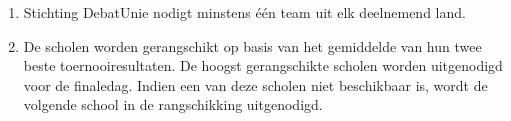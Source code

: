 
\begin{enumerate}
\item Stichting DebatUnie nodigt minstens één team uit elk deelnemend land.
\item De scholen worden gerangschikt op basis van het gemiddelde van hun twee beste toernooiresultaten. De hoogst gerangschikte scholen worden uitgenodigd voor de finaledag. Indien een van deze scholen niet beschikbaar is, wordt de volgende school in de rangschikking uitgenodigd.
\end{enumerate}